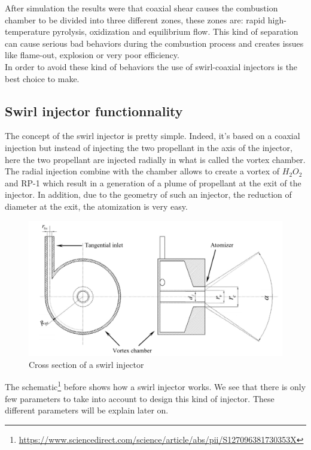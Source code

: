 After simulation the results were that coaxial shear causes the combustion chamber to be divided into three different zones, these zones are: rapid high-temperature pyrolysis, oxidization and equilibrium flow. This kind of separation can cause serious bad behaviors during the combustion process and creates issues like flame-out, explosion or very poor efficiency. \\
In order to avoid these kind of behaviors the use of swirl-coaxial injectors is the best choice to make. \\

\subsection{Swirl injector functionnality}
The concept of the swirl injector is pretty simple. Indeed, it's based on a coaxial injection but instead of injecting the two propellant in the axis of the injector, here the two propellant are injected radially in what is called the vortex chamber. 
The radial injection combine with the chamber allows to create a vortex of $H_2O_2$ and RP-1 which result in a generation of a plume of propellant at the exit of the injector. In addition, due to the geometry of such an injector, the reduction of diameter at the exit, the atomization is very easy.

\begin{figure}[H]
    \centering
    \includegraphics[width=\linewidth]{swirl}
    \caption{Cross section of a swirl injector}
\end{figure}

The schematic\footnote{\url{https://www.sciencedirect.com/science/article/abs/pii/S127096381730353X}} before shows how a swirl injector works. We see that there is only few parameters to take into account to design this kind of injector. These different parameters will be explain later on. \\

